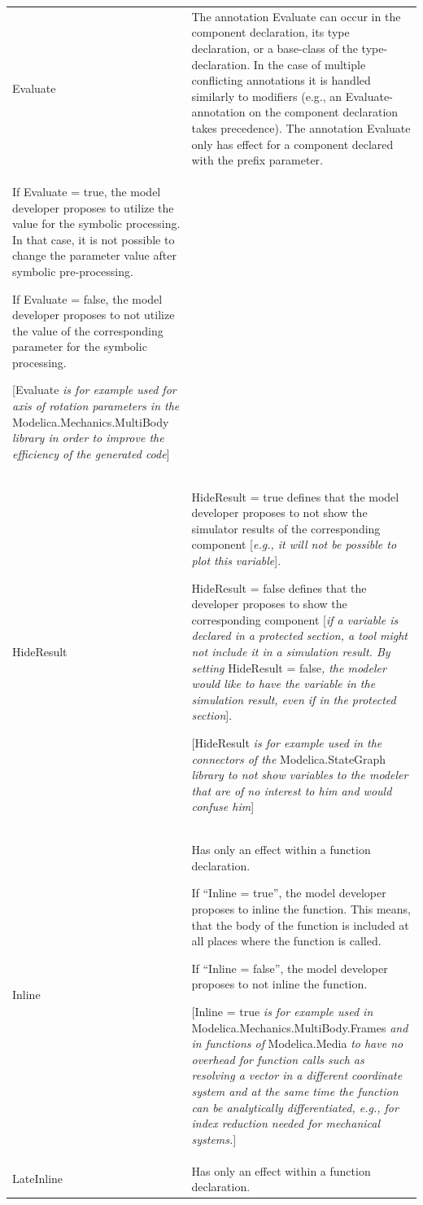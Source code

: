\documentclass[10pt,a4paper]{report}
\begin{document}
\begin{longtable}[]{@{}ll@{}}
\endhead
\hline
Evaluate&
The annotation Evaluate can occur in the component declaration, its type
declaration, or a base-class of the type-declaration. In the case of
multiple conflicting annotations it is handled similarly to modifiers
(e.g., an Evaluate-annotation on the component declaration takes
precedence). The annotation Evaluate only has effect for a component
declared with the prefix parameter.\\
If Evaluate = true, the model developer proposes to utilize the value
for the symbolic processing. In that case, it is not possible to change
the parameter value after symbolic pre-processing.

If Evaluate = false, the model developer proposes to not utilize the
value of the corresponding parameter for the symbolic processing.

{[}Evaluate \emph{is for example used for axis of rotation parameters in
the} Modelica.Mechanics.MultiBody \emph{library in order to improve the
efficiency of the generated code}{]}\\ \hline
HideResult &
HideResult = true defines that the model developer proposes to not show
the simulator results of the corresponding component {[}\emph{e.g., it
will not be possible to plot this variable}{]}.

HideResult = false defines that the developer proposes to show the
corresponding component {[}\emph{if a variable is declared in a
protected section, a tool might not include it in a simulation result.
By setting} HideResult = false\emph{, the modeler would like to have the
variable in the simulation result, even if in the protected section}{]}.

{[}HideResult \emph{is for example used in the connectors of the}
Modelica.StateGraph \emph{library to not show variables to the modeler
that are of no interest to him and would confuse him}{]}\\ \hline
Inline &
Has only an effect within a function declaration.

If ``Inline = true'', the model developer proposes to inline the
function. This means, that the body of the function is included at all
places where the function is called.

If ``Inline = false'', the model developer proposes to not inline the
function.

{[}Inline = true \emph{is for example used in}
Modelica.Mechanics.MultiBody.Frames \emph{and in functions of}
Modelica.Media \emph{to have no overhead for function calls such as
resolving a vector in a different coordinate system and at the same time
the function can be analytically differentiated, e.g., for index
reduction needed for mechanical systems.}{]}
\\ \hline
LateInline
&
Has only an effect within a function declaration.


\end{longtable}
\end{document}
